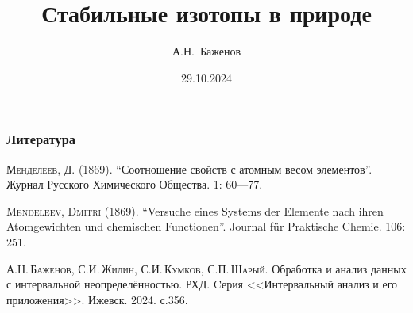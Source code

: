 \documentclass{beamer}
\title{Стабильные изотопы в природе} %
\author{А.Н.~Баженов}
\institute{%
ФТИ им.А.Ф.Иоффе РАН\\
СПбПУ Петра Великого, Физмех\\
\bigskip	
ДОПОЛНИТЕЛЬНАЯ ПРОФЕССИОНАЛЬНАЯ ПРОГРАММА ПОВЫШЕНИЯ КВАЛИФИКАЦИИ\\
<<Новейшие достижения физики и математического моделирования>> 
}
\date{29.10.2024} %
\begin{document}
\begin{frame}
\titlepage %
\end{frame}



	























\begin{frame}
\frametitle{Литература}
\begin{thebibliography}{9}

{\footnotesize
{}
\textsc{Менделеев, Д.} (1869). “Соотношение свойств с атомным весом элементов”. Журнал Русского Химического Общества. 1: 60—77.

\textsc{Mendeleev, Dmitri} (1869). “Versuche eines Systems der Elemente nach ihren Atomgewichten und chemischen Functionen”. Journal für Praktische Chemie. 106: 251.

 \textsc{А.Н.\,Баженов, С.И.\,Жилин, С.И.\,Кумков, С.П.\,Шарый.} Обработка и анализ данных с интервальной неопределённостью. РХД. Cерия <<Интервальный анализ и его приложения>>. Ижевск. 2024. с.356.	
}



\end{thebibliography}	
\end{frame}
\end{document}
